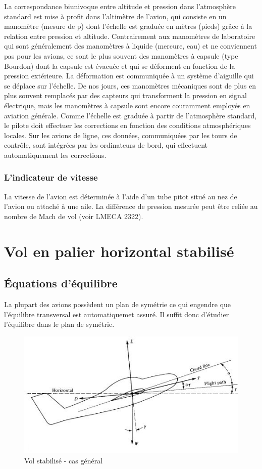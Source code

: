 \documentclass{report}
\begin{document}
La correspondance biunivoque entre altitude et pression dans l’atmosphère standard est mise à profit dans l’altimètre de l’avion, qui consiste en un manomètre (mesure de p) dont l’échelle est graduée en mètres (pieds) grâce à la relation entre pression et altitude. Contrairement aux manomètres de laboratoire qui sont généralement des manomètres à liquide (mercure, eau) et ne conviennent pas pour les avions, ce sont le plus souvent des manomètres à capsule (type Bourdon) dont la capsule est évacuée et qui se déforment en fonction de la pression extérieure. La déformation est communiquée à un système d’aiguille qui se déplace sur l’échelle. De nos jours, ces manomètres mécaniques sont de plus en plus souvent remplacés par des capteurs qui transforment la pression en signal électrique, mais les manomètres à capsule sont encore couramment
employés en aviation générale. Comme l’échelle est graduée à partir de l’atmosphère standard, le pilote doit effectuer les corrections en fonction des conditions atmosphériques locales. Sur les avions de ligne, ces données, communiquées par les tours de contrôle, sont intégrées par les ordinateurs de bord, qui effectuent automatiquement les corrections.

\subsubsection{L'indicateur de vitesse}


La vitesse de l'avion est déterminée à l'aide d'un tube pitot situé au nez de l'avion ou attaché à une aile. La différence de pression mesurée peut être reliée au nombre de Mach de vol (voir LMECA 2322).


\section{Vol en palier horizontal stabilisé}
\subsection{Équations d'équilibre}

La plupart des avions possèdent un plan de symétrie ce qui engendre que l'équilibre transversal est automatiquemet assuré. Il suffit donc d'étudier l'équilibre dans le plan de symétrie. 

\begin{figure}[h!]
    \centering
    \includegraphics{3.JPG}
    \caption{Vol stabilisé - cas général}
    \label{3}
\end{figure}
\end{document}
